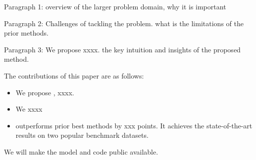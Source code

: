 


Paragraph 1: overview of the larger problem domain, why it is important

Paragraph 2: Challenges of tackling the problem. what is the limitations of the prior methods. 

Paragraph 3: We propose xxxx. the key intuition and insights of the proposed method. 


The contributions of this paper are as follows:
\begin{itemize}[nosep]
    \item We propose \method, xxxx.
    \item We xxxx
    \item \method outperforms prior best methods by xxx points. It achieves the state-of-the-art results on two popular benchmark datasets. 
\end{itemize}
We will make the model and code public available.